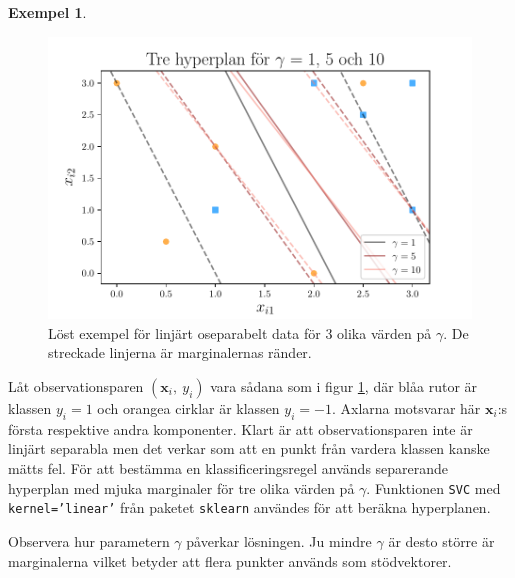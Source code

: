 \documentclass[a4paper, 12pt]{report}
\theoremstyle{definition}
\newtheorem{ex}{Exempel}[section]
\theoremstyle{remark}
\begin{document}
\begin{ex}
\begin{figure}[h]
	\centering
	\includegraphics[width=\linewidth, trim={0.35cm 1.5mm 0.4cm 4.5mm}, clip]{KandFigur2.pdf}
	\caption{\label{fig:mjukamarginaler}Löst exempel för linjärt oseparabelt data för 3 olika värden på $\gamma$. De streckade linjerna är marginalernas ränder.}
\end{figure}
Låt observationsparen $\left(\mathbf{x}_i,~y_i\right)$ vara sådana som i figur \ref{fig:mjukamarginaler}, där blåa rutor är klassen $y_i=1$ och orangea cirklar är klassen $y_i=-1$. Axlarna motsvarar här $\mathbf{x}_i$:s första respektive andra komponenter. Klart är att observationsparen inte är linjärt separabla men det verkar som att en punkt från vardera klassen kanske mätts fel. För att bestämma en klassificeringsregel används separerande hyperplan med mjuka marginaler för tre olika värden på $\gamma$. Funktionen \texttt{SVC} med \texttt{kernel='linear'} från paketet \texttt{sklearn} \cite{sklearn} användes för att beräkna hyperplanen.

Observera hur parametern $\gamma$ påverkar lösningen. Ju mindre $\gamma$ är desto större är marginalerna vilket betyder att flera punkter används som stöd\-vektorer.
\end{ex}
\newpage
\end{document}
